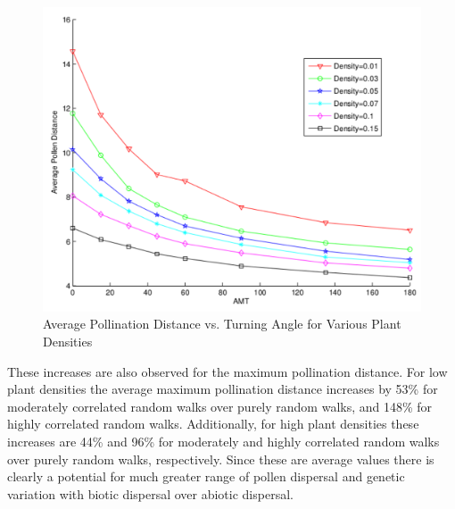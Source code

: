 \begin{figure}
  \begin{center}
  \includegraphics[scale=0.5]{Figures/PollenDVsAMT.pdf}
  \end{center}
  \caption{\small Average Pollination Distance vs. Turning Angle for Various Plant Densities}
  \label{AvgDist}
\end{figure}

These increases are also observed for the maximum pollination distance.  For low
plant densities the average maximum pollination distance increases by 53\% for
moderately correlated random walks over purely random walks, and 148\% for
highly correlated random walks.  Additionally, for high plant densities these
increases are 44\% and 96\% for moderately and highly correlated random walks
over purely random walks, respectively.  Since these are average values there is
clearly a potential for much greater range of pollen dispersal and genetic
variation with biotic dispersal over abiotic dispersal.

